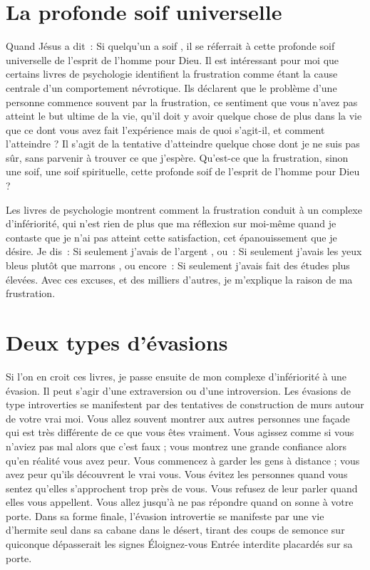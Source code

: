 \section{La profonde soif universelle}

Quand Jésus a dit~: \og Si quelqu'un a soif \fg{}, il se réferrait
 à cette profonde soif universelle de l'esprit de l'homme pour Dieu.
 Il est intéressant pour moi que certains livres de psychologie
 identifient la frustration comme étant la cause centrale
 d'un comportement névrotique. Ils déclarent que le problème
 d'une personne commence souvent par la frustration,
 ce sentiment que vous n'avez pas atteint le but ultime de la vie,
 qu'il doit y avoir quelque chose de plus dans la vie que ce dont
 vous avez fait l'expérience \ocadr mais de quoi s'agit-il, et comment
 l'atteindre ?
 Il s'agit de la tentative d'atteindre quelque chose dont je ne suis pas sûr,
 sans parvenir à trouver ce que j'espère. Qu'est-ce que la frustration,
 sinon une soif, une soif spirituelle, cette profonde soif de l'esprit
 de l'homme pour Dieu ?

Les livres de psychologie montrent comment la frustration con\-duit
 à un complexe d'infériorité, qui n'est rien de plus que ma réflexion
 sur moi-même quand je contaste que je n'ai pas atteint cette satisfaction,
 cet épanouissement que je désire. Je dis~:
 \og Si seulement j'avais de l'argent \fg{}, ou~:
 \og Si seulement j'avais les yeux bleus plutôt que marrons \fg{}, ou encore~:
 \og Si seulement j'avais fait des études plus élevées. \fg{}
 Avec ces excuses, et des milliers d'autres, je m'explique la raison
 de ma frustration.


\section{Deux types d'\'evasions}

Si l'on en croit ces livres, je passe ensuite de mon complexe
 d'in\-fé\-rio\-ri\-té à une évasion.
 Il peut s'agir d'une extraversion ou d'une introversion.
 Les évasions de type introverties se manifestent par des tentatives
 de construction de murs autour de votre vrai moi.
 Vous allez souvent montrer aux autres personnes une façade qui est très
 différente de ce que vous êtes vraiment.
 Vous agissez comme si vous n'aviez pas mal alors que c'est faux ;
 vous montrez une grande confiance alors qu'en réalité vous avez peur.
 Vous commencez à garder les gens à distance ;
 vous avez peur qu'ils découvrent le vrai vous.
 Vous évitez les personnes quand vous sentez qu'elles s'approchent
 trop près de vous. Vous refusez de leur parler quand elles vous appellent.
 Vous allez jusqu'à ne pas répondre quand on sonne à votre porte.
 Dans sa forme finale, l'évasion introvertie se manifeste par une vie
 d'hermite seul dans sa cabane dans le désert, tirant des coups de semonce
 sur quiconque dépasserait les signes
 \og Éloignez-vous \ocadr Entrée interdite \fg{} placardés sur sa porte.

